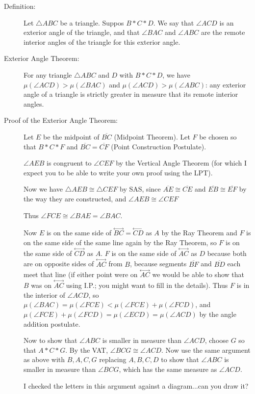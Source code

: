 \documentclass[12pt]{article}
\newcommand\Line[1]{\overset{\leftrightarrow}{#1}}
\begin{document}
\begin{description}

\item[Definition:]  Let $\triangle ABC$ be a triangle.   Suppos $B*C*D$.  We say that $\angle ACD$ is an exterior angle of the triangle, and that $\angle BAC$ and $\angle ABC$ are the remote interior angles of the triangle for this exterior angle.

\item[Exterior Angle Theorem:]  For any triangle $\triangle ABC$ and $D$ with $B*C*D$, we have $\mu(\angle ACD) > \mu(\angle BAC)$ and $\mu(\angle ACD) > \mu(\angle ABC)$:  any exterior angle of a triangle is strictly greater in measure that its remote interior angles.

\item[Proof of the Exterior Angle Theorem:]

Let $E$ be the midpoint of $\overline{BC}$ (Midpoint Theorem).  Let $F$ be chosen so that $B*C*F$ and $\overline{BC} = \overline{CF}$ (Point Construction  Postulate).

$\angle AEB$ is congruent to $\angle CEF$ by the Vertical Angle Theorem (for which I expect you to be able to write your own proof using the LPT).

Now we have $\triangle AEB \cong \triangle  CEF$ by SAS, since $\overline{AE} \cong \overline {CE}$ and $\overline{EB} \cong \overline{EF}$ by the way they are constructed,
and $\angle AEB \cong \angle CEF$

Thus $\angle FCE \cong \angle BAE = \angle BAC$.

Now $E$ is on the same side of $\Line{BC} = \Line{CD}$ as $A$ by the Ray Theorem and $F$ is on the same side of the same line again by the Ray Theorem,
so $F$ is on the same side of $\Line{CD}$ as $A$.  $F$ is on the same side of $\Line{AC}$ as $D$ because both are on opposite sides of $\Line{AC}$ from $B$, because segments
$\overline{BF}$ and $\overline{BD}$ each meet that line (if either point were on $\Line{AC}$ we would be able to show that $B$ was on $\Line{AC}$ using I.P.; you might want to fill in the details).  Thus $F$ is in the interior of $\angle{ACD}$, so $\mu(\angle BAC) = \mu(\angle FCE) < \mu(\angle FCE) + \mu(\angle FCD)$, and $\mu(\angle FCE) + \mu(\angle FCD) = \mu(\angle ECD) = \mu(\angle ACD)$ by the angle addition postulate.

Now to show that $\angle{ABC}$ is smaller in measure than $\angle{ACD}$, choose $G$ so that $A*C*G$.  By the VAT, $\angle BCG \cong \angle ACD$.  Now use the same argument as above with $B, A, C, G$ replacing $A, B, C, D$ to show  that $\angle{ABC}$ is smaller in measure than $\angle{BCG}$, which has the same measure as $\angle ACD$.

I checked the letters in this argument against a diagram...can you draw it?

\end{description}
\end{document}
